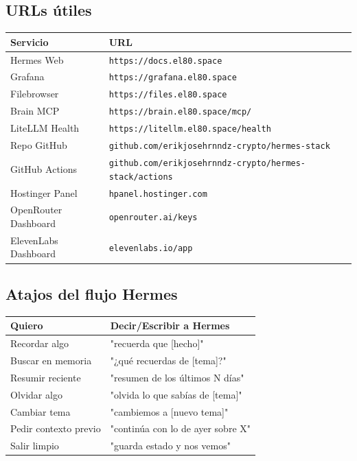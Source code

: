 \documentclass[11pt,a4paper]{article}
\begin{document}
\subsection{URLs útiles}

\begin{center}
\begin{tabularx}{0.95\textwidth}{|l|X|}
\hline
\rowcolor{manualgreen}\color{white}\textbf{Servicio} & \color{white}\textbf{URL}\\
\hline
Hermes Web & \texttt{https://docs.el80.space}\\
Grafana & \texttt{https://grafana.el80.space}\\
Filebrowser & \texttt{https://files.el80.space}\\
Brain MCP & \texttt{https://brain.el80.space/mcp/}\\
LiteLLM Health & \texttt{https://litellm.el80.space/health}\\
Repo GitHub & \texttt{github.com/erikjosehrnndz-crypto/hermes-stack}\\
GitHub Actions & \texttt{github.com/erikjosehrnndz-crypto/hermes-stack/actions}\\
Hostinger Panel & \texttt{hpanel.hostinger.com}\\
OpenRouter Dashboard & \texttt{openrouter.ai/keys}\\
ElevenLabs Dashboard & \texttt{elevenlabs.io/app}\\
\hline
\end{tabularx}
\end{center}

\subsection{Atajos del flujo Hermes}

\begin{center}
\begin{tabularx}{0.95\textwidth}{|l|X|}
\hline
\rowcolor{manualgreen}\color{white}\textbf{Quiero} & \color{white}\textbf{Decir/Escribir a Hermes}\\
\hline
Recordar algo & "recuerda que [hecho]"\\
Buscar en memoria & "¿qué recuerdas de [tema]?"\\
Resumir reciente & "resumen de los últimos N días"\\
Olvidar algo & "olvida lo que sabías de [tema]"\\
Cambiar tema & "cambiemos a [nuevo tema]"\\
Pedir contexto previo & "continúa con lo de ayer sobre X"\\
Salir limpio & "guarda estado y nos vemos"\\
\hline
\end{tabularx}
\end{center}
\end{document}
